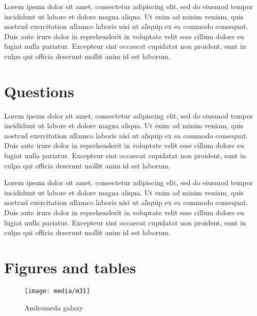 \documentclass[12pt,a4paper]{report}
\begin{document}
Lorem ipsum dolor sit amet, consectetur adipiscing elit, sed do eiusmod tempor incididunt ut labore et dolore magna aliqua. Ut enim ad minim veniam, quis nostrud exercitation ullamco laboris nisi ut aliquip ex ea commodo consequat. Duis aute irure dolor in reprehenderit in voluptate velit esse cillum dolore eu fugiat nulla pariatur. Excepteur sint occaecat cupidatat non proident, sunt in culpa qui officia deserunt mollit anim id est laborum.


\section{Questions}

Lorem ipsum dolor sit amet, consectetur adipiscing elit, sed do eiusmod tempor incididunt ut labore et dolore magna aliqua. Ut enim ad minim veniam, quis nostrud exercitation ullamco laboris nisi ut aliquip ex ea commodo consequat. Duis aute irure dolor in reprehenderit in voluptate velit esse cillum dolore eu fugiat nulla pariatur. Excepteur sint occaecat cupidatat non proident, sunt in culpa qui officia deserunt mollit anim id est laborum.

Lorem ipsum dolor sit amet, consectetur adipiscing elit, sed do eiusmod tempor incididunt ut labore et dolore magna aliqua. Ut enim ad minim veniam, quis nostrud exercitation ullamco laboris nisi ut aliquip ex ea commodo consequat. Duis aute irure dolor in reprehenderit in voluptate velit esse cillum dolore eu fugiat nulla pariatur. Excepteur sint occaecat cupidatat non proident, sunt in culpa qui officia deserunt mollit anim id est laborum.


\section{Figures and tables}

\begin{figure}[hbtp!]
  \centering
  \texttt{[image: media/m31]}
  \caption{Andromeda galaxy}
    \label{fig:m31}
\end{figure}
\end{document}
